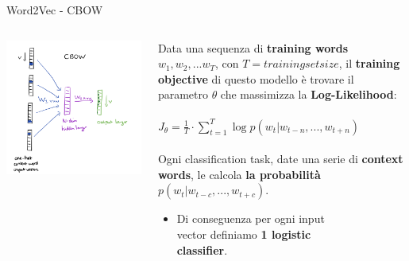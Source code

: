 \documentclass[british]{beamer}
\begin{document}
\begin{frame}{Word2Vec - CBOW}
	\begin{columns}
		\begin{column}{0.4\textwidth}
			\includegraphics[width=1.2\linewidth,height=1.4\textwidth]{./Imgs/cbow}
		\end{column}
		\begin{column}{0.6\textwidth}
			Data una sequenza di \textbf{training words} \(w_1, w_2, ... w_T\), con \(T = trainingsetsize\), il \textbf{training objective} di questo modello \`{e} trovare il parametro \(\theta\) che massimizza la \textbf{Log-Likelihood}:
			\\~\\
			\(J_{\theta} = \frac{1}{T}\cdot\sum_{t=1}^{T}\log p(w_{t}|w_{t-n}, ... , w_{t+n})\)
			\\~\\
			Ogni classification task, date una serie di \textbf{context words}, le  calcola \textbf{la probabilit\`{a}} \(p(w_{t}|w_{t-c}, ... , w_{t+c})\).
			\begin{itemize}
				\item Di conseguenza per ogni input\\ vector definiamo \textbf{1 logistic\\ classifier}.
			\end{itemize}
		\end{column}
	\end{columns}
\end{frame}
\end{document}
